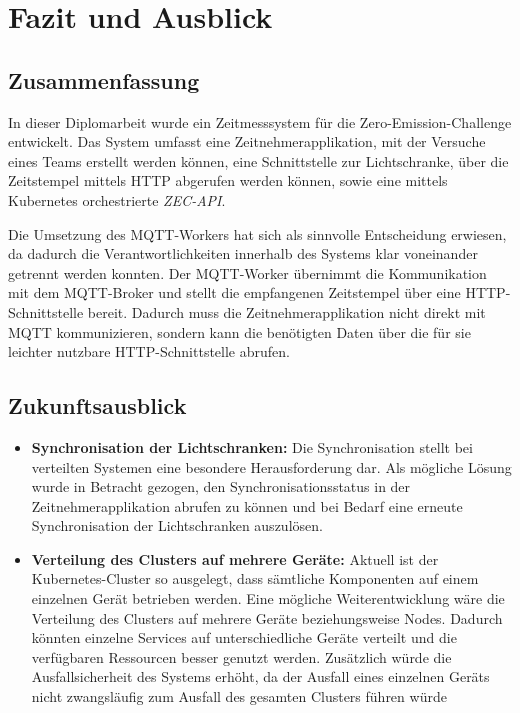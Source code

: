 \section{Fazit und Ausblick}

\subsection{Zusammenfassung}

In dieser Diplomarbeit wurde ein Zeitmesssystem für die Zero-Emission-Challenge entwickelt. Das System umfasst eine Zeitnehmerapplikation, mit der Versuche eines Teams erstellt werden können, eine Schnittstelle zur Lichtschranke, über die Zeitstempel mittels HTTP abgerufen werden können, sowie eine mittels Kubernetes orchestrierte \textit{ZEC-API}.

Die Umsetzung des MQTT-Workers hat sich als sinnvolle Entscheidung erwiesen, da dadurch die Verantwortlichkeiten innerhalb des Systems klar voneinander getrennt werden konnten. Der MQTT-Worker übernimmt die Kommunikation mit dem MQTT-Broker und stellt die empfangenen Zeitstempel über eine HTTP-Schnittstelle bereit. Dadurch muss die Zeitnehmerapplikation nicht direkt mit MQTT kommunizieren, sondern kann die benötigten Daten über die für sie leichter nutzbare HTTP-Schnittstelle abrufen.

\subsection{Zukunftsausblick}

\begin{itemize}
    \item \textbf{Synchronisation der Lichtschranken: } Die Synchronisation stellt bei verteilten Systemen eine besondere Herausforderung dar. Als mögliche Lösung wurde in Betracht gezogen, den Synchronisationsstatus in der Zeitnehmerapplikation abrufen zu können und bei Bedarf eine erneute Synchronisation der Lichtschranken auszulösen.
    \item \textbf{Verteilung des Clusters auf mehrere Geräte: } Aktuell ist der Kubernetes-Cluster so ausgelegt, dass sämtliche Komponenten auf einem einzelnen Gerät betrieben werden. Eine mögliche Weiterentwicklung wäre die Verteilung des Clusters auf mehrere Geräte beziehungsweise Nodes. Dadurch könnten einzelne Services auf unterschiedliche Geräte verteilt und die verfügbaren Ressourcen besser genutzt werden. Zusätzlich würde die Ausfallsicherheit des Systems erhöht, da der Ausfall eines einzelnen Geräts nicht zwangsläufig zum Ausfall des gesamten Clusters führen würde
\end{itemize}
